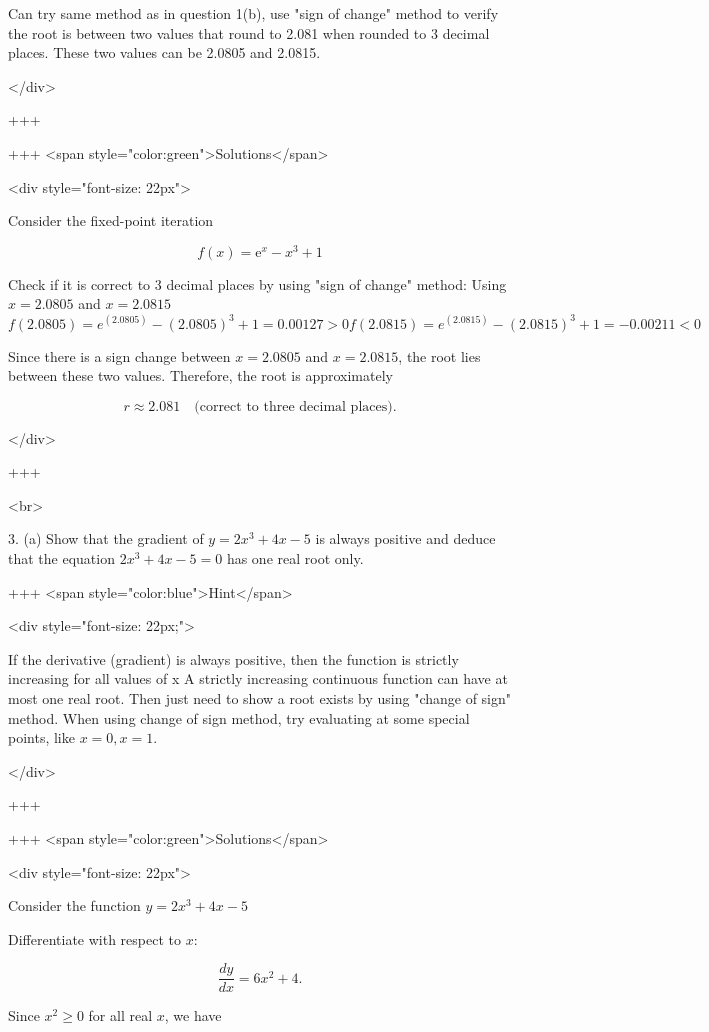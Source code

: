Can try same method as in question 1(b), use "sign of change" method to verify the root is between two values that round to 2.081 when rounded to 3 decimal places.
These two values can be 2.0805 and 2.0815.

</div>

+++

+++ <span style="color:green">Solutions</span>

<div style="font-size: 22px">

Consider the fixed-point iteration

$$
f(x) = \mathrm{e}^{x}-x^{3}+1
$$

Check if it is correct to 3 decimal places by using "sign of change" method:
Using $x=2.0805$ and $x=2.0815$
$$
f(2.0805) = e^(2.0805) - (2.0805)^3 + 1 = 0.00127 >0
f(2.0815) = e^(2.0815) - (2.0815)^3 + 1 = -0.00211 <0
$$

Since there is a sign change between $x=2.0805$ and $x=2.0815$, the root lies between these two values. Therefore, the root is approximately

$$
r\approx 2.081\quad\text{(correct to three decimal places).}
$$

</div>

+++

<br>

3. (a) Show that the gradient of $y=2 x^{3}+4 x-5$ is always positive and deduce that the equation $2 x^{3}+4 x-5=0$ has one real root only.

+++ <span style="color:blue">Hint</span>

<div style="font-size: 22px;">

If the derivative (gradient) is always positive, then the function is strictly increasing for all values of x
A strictly increasing continuous function can have at most one real root. Then just need to show a root exists by using "change of sign" method.
When using change of sign method, try evaluating at some special points, like $x=0, x=1$.

</div>

+++

+++ <span style="color:green">Solutions</span>

<div style="font-size: 22px">

Consider the function $y=2x^{3}+4x-5$

Differentiate with respect to $x$:

$$
\frac{dy}{dx}=6x^{2}+4.
$$

Since $x^{2}\ge 0$ for all real $x$, we have

